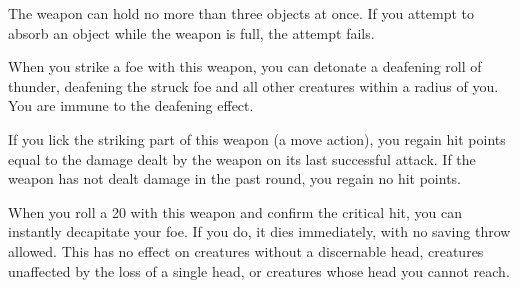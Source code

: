 The weapon can hold no more than three objects at once. If you attempt to absorb an object while the weapon is full, the attempt fails. 


 When you strike a foe with this weapon, you can detonate a deafening roll of thunder, deafening the struck foe and all other creatures within a \areasmall radius of you. You are immune to the deafening effect.


 If you lick the striking part of this weapon (a move action), you regain hit points equal to the damage dealt by the weapon on its last successful attack. If the weapon has not dealt damage in the past round, you regain no hit points.


 When you roll a 20 with this weapon and confirm the critical hit, you can instantly decapitate your foe. If you do, it dies immediately, with no saving throw allowed. This has no effect on creatures without a discernable head, creatures unaffected by the loss of a single head, or creatures whose head you cannot reach.


\begin{comment}
\subsection{Rods}

Rods are scepterlike devices that have unique magical powers and do not usually have charges. Anyone can use a rod.

\parhead{Physical Description} Rods weigh approximately 5 pounds.

They range from 2 feet to 3 feet long and are usually made of iron or some other metal. (Many, as noted in their descriptions, can function as light maces or clubs due to their sturdy construction.)

These sturdy items have AC 9, 10 hit points, hardness 10, and a break DC of 27.

\parhead{Activation} Details relating to rod use vary from item to item. See the individual descriptions for specifics.
\end{comment}

